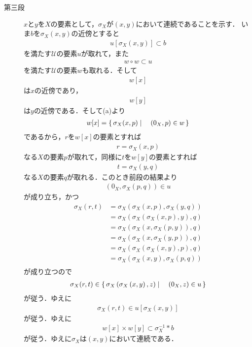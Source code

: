 \begin{sketch}
\begin{description}
			\item[第三段] $x$と$y$を$X$の要素として，$\sigma_X$が$(x,y)$において連続であることを示す．
				いま$b$を$\sigma_X\left(x,y\right)$の近傍とすると
				\begin{align}
					u\left[\sigma_X(x,y)\right] \subset b
				\end{align}
				を満たす$\mathscr{U}$の要素$u$が取れて，また
				\begin{align}
					w \circ w \subset u
				\end{align}
				を満たす$\mathscr{U}$の要素$w$も取れる．そして
				\begin{align}
					w[x]
				\end{align}
				は$x$の近傍であり，
				\begin{align}
					w[y]
				\end{align}
				は$y$の近傍である．そして(a)より
				\begin{align}
					w[x] = \left\{\, \sigma_X(x,p) \mid \quad (0_X,p) \in w\, \right\}
				\end{align}
				であるから，$r$を$w[x]$の要素とすれば
				\begin{align}
					r = \sigma_X(x,p)
				\end{align}
				なる$X$の要素$p$が取れて，同様に$t$を$w[y]$の要素とすれば
				\begin{align}
					t = \sigma_X(y,q)
				\end{align}
				なる$X$の要素$q$が取れる．このとき前段の結果より
				\begin{align}
					\left(0_X,\sigma_X\left(p,q\right)\right) \in u
				\end{align}
				が成り立ち，かつ
				\begin{align}
					\sigma_X(r,t) &= \sigma_X\left(\sigma_X\left(x,p\right),\sigma_X\left(y,q\right)\right) \\
					&= \sigma_X\left(\sigma_X\left(\sigma_X\left(x,p\right),y\right),q\right) \\
					&= \sigma_X\left(\sigma_X\left(x,\sigma_X\left(p,y\right)\right),q\right) \\
					&= \sigma_X\left(\sigma_X\left(x,\sigma_X\left(y,p\right)\right),q\right) \\
					&= \sigma_X\left(\sigma_X\left(\sigma_X\left(x,y\right),p\right),q\right) \\
					&= \sigma_X\left(\sigma_X\left(x,y\right),\sigma_X\left(p,q\right)\right) \\
				\end{align}
				が成り立つので
				\begin{align}
					\sigma_X(r,t) \in \left\{\, \sigma_X\left(\sigma_X\left(x,y\right),z\right) \mid \quad (0_X,z) \in u\, \right\}
				\end{align}
				が従う．ゆえに
				\begin{align}
					\sigma_X(r,t) \in u\left[\sigma_X(x,y)\right]
				\end{align}
				が従う．ゆえに
				\begin{align}
					w[x] \times w[y] \subset \sigma_X^{-1} \ast b
				\end{align}
				が従う．ゆえに$\sigma_X$は$(x,y)$において連続である．
				

\end{description}
\end{sketch}
